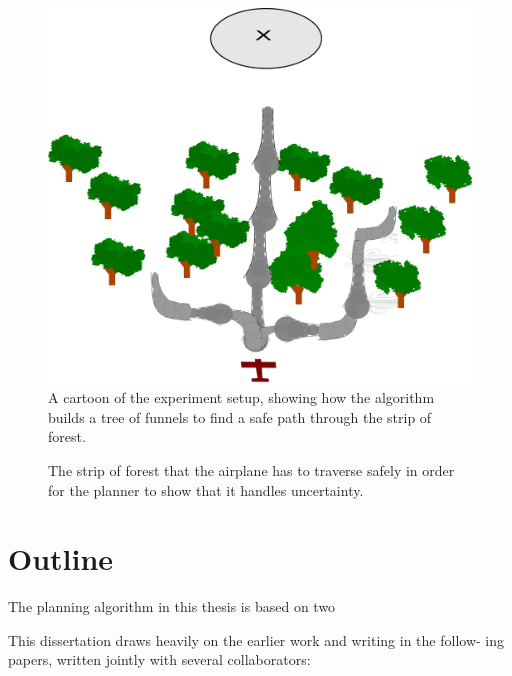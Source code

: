 \begin{figure}
  \centering \includegraphics[scale=.1]{figures/experiments/experiment-airplane-strip}
  \caption{A cartoon of the experiment setup, showing how the \rrtfunnel{}
    algorithm builds a tree of funnels to find a safe path through the strip of
    forest.}
  \label{fig:experiments-airplane-strip}
\end{figure}

\begin{figure}
  \centering
  \caption{The strip of forest that the airplane has to traverse safely in order
  for the planner to show that it handles uncertainty.}
\label{fig:experiment-cartoon}
\end{figure} 



\section{Outline}

The planning algorithm in this thesis is based on two 

This dissertation draws heavily on the earlier work and writing in the follow-
ing papers, written jointly with several collaborators:

\cite{majumdarFunnelLibrariesRealtime2017}

